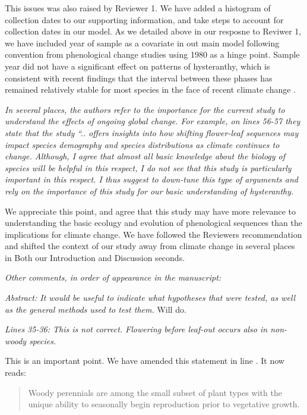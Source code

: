 \documentclass{article}[12pt]
\begin{document}
This issues was also raised by Reviewer 1. We have added a histogram of collection dates to our supporting information, and take steps to account for collection dates in our model. As we detailed above in our resposne to  Reviwer 1, we have included year of sample as a covariate in out main model following convention from phenological change studies using 1980 as a hinge point. Sample year did not have a significant effect on patterns of hysteranthy, which is consistent with recent findings that the interval between these phases has remained relatively stable for most species in the face of recent climate change \citep{}. 


\emph{In several places, the authors refer to the importance for the current study to understand the effects of ongoing global change. For example, on lines 56-57 they state that the study “.. offers insights into how shifting flower-leaf sequences may impact species demography and species distributions as climate continues to change. Although, I agree that almost all basic knowledge about the biology of species will be helpful in this respect, I do not see that this study is particularly important in this respect. I thus suggest to down-tune this type of arguments and rely on the importance of this study for our basic understanding of hysteranthy.}

We appreciate this point, and agree that this study may have more relevance to understanding the basic ecolugy and evolution of phenological sequences than the implications for climate change. We have followed the Reviewers recommendation and shifted the context of our study away from climate change in several places in Both our Introduction and Discussion seconds.

\emph{Other comments, in order of appearance in the manuscript:}

\emph{Abstract: It would be useful to indicate what hypotheses that were tested, as well as the general methods used to test them.}
Will do.

\emph{Lines 35-36: This is not correct. Flowering before leaf-out occurs also in non-woody species.}


This is an important point. We have amended this statement in line . It now reads:
\begin{quote} Woody perennials are among the small subset of plant types with the unique ability to seasonally begin reproduction prior to vegetative growth.\end{quote}
\end{document}
